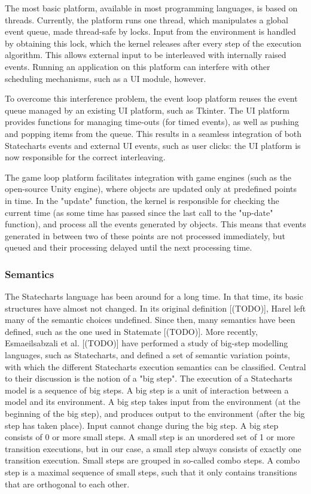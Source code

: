The most basic platform, available in most programming languages, is based on threads. Currently, the platform runs one thread, 
which manipulates a global event queue, made thread-safe by locks. Input from the environment is handled by obtaining this lock, 
which the kernel releases after every step of the execution algorithm. This allows external input to be interleaved with 
internally raised events. Running an application on this platform can interfere with other scheduling mechanisms, such as a UI 
module, however.

To overcome this interference problem, the event loop platform reuses the event queue managed by an existing UI platform, such 
as Tkinter. The UI platform provides functions for managing time-outs (for timed events), as well as pushing and popping items 
from the queue. This results in a seamless integration of both Statecharts events and external UI events, such as user clicks: 
the UI platform is now responsible for the correct interleaving.

The game loop platform facilitates integration with game engines (such as the open-source Unity engine), where objects are 
updated only at predefined points in time. In the "update" function, the kernel is responsible for checking the current time 
(as some time has passed since the last call to the "up-date" function), and process all the events generated by objects. This 
means that events generated in between two of these points are not processed immediately, but queued and their processing delayed 
until the next processing time.

\subsubsection{Semantics}
The Statecharts language has been around for a long time. In that time, its basic structures have almost not changed. In its 
original definition [(TODO)], Harel left many of the semantic choices undefined. Since then, many semantics have been defined, 
such as the one used in Statemate [(TODO)]. More recently, Esmaeilsabzali et al. [(TODO)] have performed a study of big-step 
modelling languages, such as Statecharts, and defined a set of semantic variation points, with which the different Statecharts 
execution semantics can be classified. Central to their discussion is the notion of a "big step". The execution of a Statecharts 
model is a sequence of big steps. A big step is a unit of interaction between a model and its environment. A big step takes input 
from the environment (at the beginning of the big step), and produces output to the environment (after the big step has taken 
place). Input cannot change during the big step. A big step consists of 0 or more small steps. A small step is an unordered set 
of 1 or more transition executions, but in our case, a small step always consists of exactly one transition execution. Small steps 
are grouped in so-called combo steps. A combo step is a maximal sequence of small steps, such that it only contains transitions 
that are orthogonal to each other.

